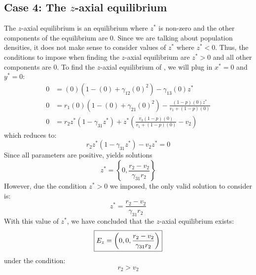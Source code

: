 \subsection{Case 4: The $z$-axial equilibrium}\label{subsec:z_axial_equilibrium}
The $z$-axial equilibrium is an equilibrium where $z^*$ is non-zero and the other components of the equilibrium are 0. Since we are talking about population densities, it does not make sense to consider values of $z^*$ where $z^*<0$. Thus, the conditions to impose when finding the $z$-axial equilibrium are $z^*>0$ and all other components are 0. To find the $z$-axial equilibrium of , we will plug in $x^*=0$ and $y^*=0$:
\begin{align*}
    0 &= (0)\left(1-(0)+\gamma_{12}(0)^2\right)-\gamma_{13}(0)z^*\\
    0 &= r_1(0)\left(1-(0)+\gamma_{21}(0)^2\right)-\frac{\left(1-p\right)(0)z^*}{v_1+\left(1-p\right)(0)}\\
    0 &= r_2z^*\left(1-\gamma_{31}z^*\right)+z^*\left(\frac{v_3\left(1-p\right)(0)}{v_1+\left(1-p\right)(0)}-v_2\right)
\end{align*}
which reduces to:
\begin{equation}
    r_2z^*\left(1-\gamma_{31}z^*\right)-v_2z^*=0
    \label{eq:4.4}
\end{equation}
Since all parameters are positive,  yields solutions
\[
z^*=\left\{0, \frac{r_2-v_2}{\gamma_{31}r_2}\right\}
\]
However, due the condition $z^*>0$ we imposed, the only valid solution to consider is:
\[
z^*=\frac{r_2-v_2}{\gamma_{31}r_2}
\]
With this value of $z^*$, we have concluded that the $z$-axial equilibrium exists:
\[
\fbox{$\displaystyle E_z=\left(
0,
0,
\frac{r_2-v_2}{\gamma_{31}r_2}
\right)$}
\]
under the condition:
\[
r_2>v_2
\]

